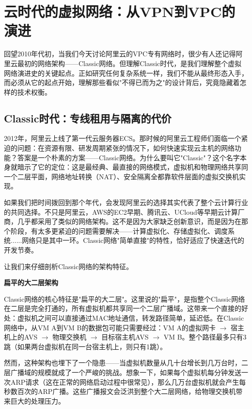 \section{云时代的虚拟网络：从VPN到VPC的演进}

回望2010年代初，当我们今天讨论阿里云的VPC专有网络时，很少有人还记得阿里云最初的网络架构——Classic网络。但理解Classic时代，是我们理解整个虚拟网络演进史的关键起点。正如研究任何复杂系统一样，我们不能从最终形态入手，而必须从它的起点开始，理解那些看似"不得已而为之"的设计背后，究竟隐藏着怎样的技术权衡。

\subsection{Classic时代：专线租用与隔离的代价}

2012年，阿里云上线了第一代云服务器ECS。那时候的阿里云工程师们面临一个紧迫的问题：在资源有限、研发周期紧张的情况下，如何快速实现云主机的网络功能？答案是一个朴素的方案——Classic网络。为什么要叫它"Classic"？这个名字本身就暗示了它的定位：这是最经典、最直接的网络模式，虚拟机和物理网络共享同一个二层平面，网络地址转换（NAT）、安全隔离全都靠软件层面的虚拟交换机实现。

如果我们把时间拨回到那个年代，会发现阿里云的选择其实代表了整个云计算行业的共同选择。不只是阿里云，AWS的EC2早期、腾讯云、UCloud等早期云计算厂商，几乎都采用了类似的网络架构。这不是因为大家缺乏创新意识，而是因为在那个阶段，有太多更紧迫的问题需要解决——计算虚拟化、存储虚拟化、调度系统......网络只是其中一环。Classic网络"简单直接"的特性，恰好适应了快速迭代的开发节奏。

让我们来仔细剖析Classic网络的架构特征。

\textbf{扁平的大二层架构}

Classic网络的核心特征是"扁平的大二层"。这里说的"扁平"，是指整个Classic网络在二层是完全打通的，所有虚拟机都共享同一个二层广播域。这带来一个直接的好处：虚拟机之间可以直接通过MAC地址通信，转发路径简单，延迟低。在Classic网络中，从VM A到VM B的数据包可能只需要经过：VM A的虚拟网卡 $\rightarrow$ 宿主机上的AVS $\rightarrow$ 物理交换机 $\rightarrow$ 目标宿主机AVS $\rightarrow$ VM B。整个路径最多只有3跳（如果两台虚拟机在同一台宿主机上，则只有1跳）。

然而，这种架构也埋下了一个隐患——当虚拟机数量从几十台增长到几万台时，二层广播域的规模就成了一个严峻的挑战。想象一下，如果每个虚拟机每分钟发送一次ARP请求（这在正常的网络启动过程中很常见），那么几万台虚拟机就会产生每秒数百次的ARP广播。这些广播报文会泛洪到整个大二层网络，给物理交换机带来巨大的处理压力。

